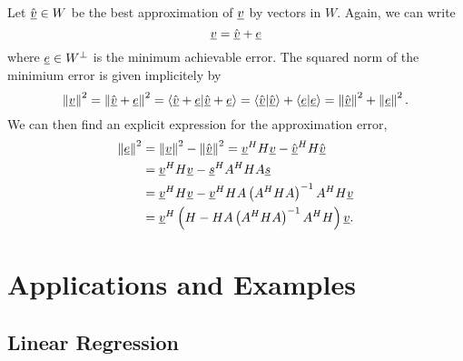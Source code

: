Let $\hat{\underline{v}} \in W$ be the best approximation of $\underline{v}$ by vectors in $W$.
Again, we can write
\begin{equation*}
\underline{v} = \hat{\underline{v}} + \underline{e}
\end{equation*}
where $\underline{e} \in W^{\bot}$ is the minimum achievable error.
The squared norm of the minimium error is given implicitely by
\begin{equation*}
\left\| \underline{v} \right\|^2
= \left\| \hat{\underline{v}} + \underline{e} \right\|^2
= \left\langle \hat{\underline{v}} + \underline{e} | \hat{\underline{v}} + \underline{e} \right\rangle
= \left\langle \hat{\underline{v}} | \hat{\underline{v}} \right\rangle
+ \left\langle \underline{e} | \underline{e} \right\rangle
= \left\| \hat{\underline{v}} \right\|^2 + \left\| \underline{e} \right\|^2 .
\end{equation*}
We can then find an explicit expression for the approximation error,
\begin{equation*}
\begin{split}
\left\| \underline{e} \right\|^2
&= \left\| \underline{v} \right\|^2
- \left\| \hat{\underline{v}} \right\|^2
= \underline{v}^H H \underline{v} - \hat{\underline{v}}^H H \hat{\underline{v}} \\
&= \underline{v}^H H \underline{v} - \underline{s}^H A^H H A \underline{s} \\
&= \underline{v}^H H \underline{v}
- \underline{v}^H H A \left( A^H H A \right)^{-1} A^H H \underline{v} \\
&= \underline{v}^H
\left( H -  H A \left( A^H H A \right)^{-1} A^H H \right)
\underline{v}.
\end{split}
\end{equation*}


\section{Applications and Examples}

\subsection{Linear Regression}

